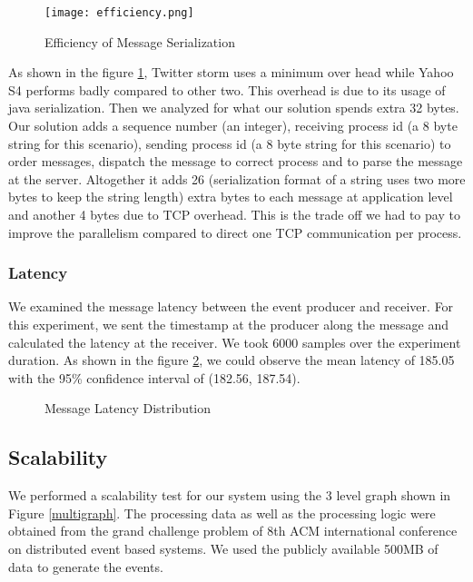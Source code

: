 \begin{figure}[!t]
        \centering
        \texttt{[image: efficiency.png]}

        \caption{Efficiency of Message Serialization}
        \label{efficiency}
\end{figure}

As shown in the figure \ref{efficiency}, Twitter storm\cite{twitterStorm} uses a minimum over head while Yahoo S4\cite{neumeyer2010s4} performs badly compared to other two. This overhead is due to its usage of java serialization. Then we analyzed for what our solution spends extra 32 bytes. Our solution adds a sequence number (an integer), receiving process id (a 8 byte string for this scenario), sending process id (a 8 byte string for this scenario) to order messages, dispatch the message to correct process and to parse the message at the server. Altogether it adds 26 (serialization format of a string uses two more bytes to keep the string length) extra bytes to each message at application level and another 4 bytes due to TCP overhead. This is the trade off we had to pay to improve the parallelism compared to direct one TCP communication per process. 

\subsubsection{Latency}
We examined the message latency between the event producer and receiver. For this experiment, we sent the timestamp at the producer along the message and calculated the latency at the receiver. We took 6000 samples over the experiment duration. As shown in the figure \ref{latancydis}, we could observe the mean latency of 185.05 with the 95\% confidence interval of (182.56, 187.54). 

\begin{figure}[!t]
        \centering
        \hfil
        \caption{Message Latency Distribution}
        \label{latancydis}
\end{figure}


\subsection{Scalability}
We performed a scalability test for our system using the 3 level graph shown in Figure \ref{multigraph}. The processing data as well as the processing logic were obtained from the grand challenge problem of 8th ACM international conference on distributed event based systems. We used the publicly available 500MB of data to generate the events. 

